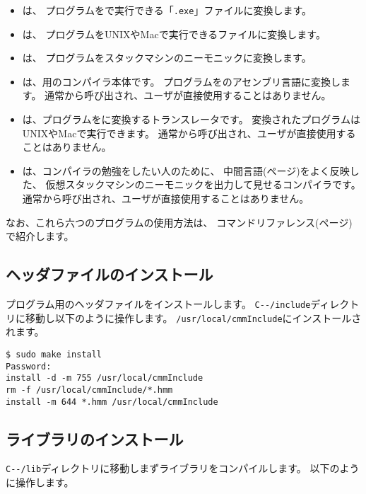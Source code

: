 \begin{itemize}
\item {\cme}は、
{\cmm}プログラムを{\tac}で実行できる「{\tt .exe}」ファイルに変換します。
\item {\cmc}は、
{\cmm}プログラムをUNIXやMacで実行できるファイルに変換します。
\item {\cmv}は、
{\cmm}プログラムをスタックマシンのニーモニックに変換します。
\item {\cmmc}は、{\tac}用の{\cmml}コンパイラ本体です。
{\cmm}プログラムを{\tac}のアセンブリ言語に変換します。
通常{\cme}から呼び出され、ユーザが直接使用することはありません。
\item {\ccmmc}は、{\cmm}プログラムを{\cl}に変換するトランスレータです。
変換された{\cl}プログラムはUNIXやMacで実行できます。
通常{\cmc}から呼び出され、ユーザが直接使用することはありません。
\item {\vcmmc}は、コンパイラの勉強をしたい人のために、
中間言語(\pageref{app:vm}ページ)をよく反映した、
仮想スタックマシンのニーモニックを出力して見せるコンパイラです。
通常{\cmv}から呼び出され、ユーザが直接使用することはありません。
\end{itemize}

なお、これら六つのプログラムの使用方法は、
コマンドリファレンス(\pageref{app:command}ページ)で紹介します。

\subsection{ヘッダファイルのインストール}

{\cmml}プログラム用のヘッダファイルをインストールします。
\verb;C--/include;ディレクトリに移動し以下のように操作します。
\verb;/usr/local/cmmInclude;にインストールされます。

\begin{mylist}
\begin{verbatim}
$ sudo make install
Password:
install -d -m 755 /usr/local/cmmInclude
rm -f /usr/local/cmmInclude/*.hmm
install -m 644 *.hmm /usr/local/cmmInclude
\end{verbatim}
\end{mylist}

\subsection{ライブラリのインストール}

\verb;C--/lib;ディレクトリに移動しまずライブラリをコンパイルします。
以下のように操作します。

